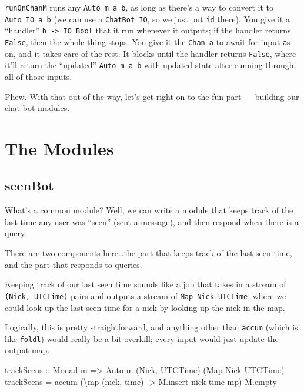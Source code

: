 \documentclass[]{article}
\newenvironment{Shaded}{}{}
\newcommand{\DataTypeTok}[1]{\textcolor[rgb]{0.56,0.13,0.00}{{#1}}}
\newcommand{\OtherTok}[1]{\textcolor[rgb]{0.00,0.44,0.13}{{#1}}}
\newcommand{\FunctionTok}[1]{\textcolor[rgb]{0.02,0.16,0.49}{{#1}}}
\newcommand{\NormalTok}[1]{{#1}}
\begin{document}
\texttt{runOnChanM} runs any \texttt{Auto\ m\ a\ b}, as long as there's
a way to convert it to \texttt{Auto\ IO\ a\ b} (we can use a
\texttt{ChatBot\ IO}, so we just put \texttt{id} there). You give it a
``handler'' \texttt{b\ -\textgreater{}\ IO\ Bool} that it run whenever
it outputs; if the handler returns \texttt{False}, then the whole thing
stops. You give it the \texttt{Chan\ a} to await for input \texttt{a}s
on, and it takes care of the rest. It blocks until the handler returns
\texttt{False}, where it'll return the ``updated''
\texttt{Auto\ m\ a\ b} with updated state after running through all of
those inputs.

Phew. With that out of the way, let's get right on to the fun part ---
building our chat bot modules.

\section{The Modules}\label{the-modules}

\subsection{seenBot}\label{seenbot}

What's a common module? Well, we can write a module that keeps track of
the last time any user was ``seen'' (sent a message), and then respond
when there is a query.

There are two components here\ldots{}the part that keeps track of the
last seen time, and the part that responds to queries.

Keeping track of our last seen time sounds like a job that takes in a
stream of \texttt{(Nick,\ UTCTime)} pairs and outputs a stream of
\texttt{Map\ Nick\ UTCTime}, where we could look up the last seen time
for a nick by looking up the nick in the map.

Logically, this is pretty straightforward, and anything other than
\texttt{accum} (which is like \texttt{foldl\textquotesingle{}}) would
really be a bit overkill; every input would just update the output map.

\begin{Shaded}
\begin{Highlighting}[]
\OtherTok{trackSeens ::} \DataTypeTok{Monad} \NormalTok{m }\OtherTok{=>} \DataTypeTok{Auto} \NormalTok{m (}\DataTypeTok{Nick}\NormalTok{, }\DataTypeTok{UTCTime}\NormalTok{) (}\DataTypeTok{Map} \DataTypeTok{Nick} \DataTypeTok{UTCTime}\NormalTok{)}
\NormalTok{trackSeens }\FunctionTok{=} \NormalTok{accum (\textbackslash{}mp (nick, time) }\OtherTok{->} \NormalTok{M.insert nick time mp) M.empty}
\end{Highlighting}
\end{Shaded}
\end{document}
